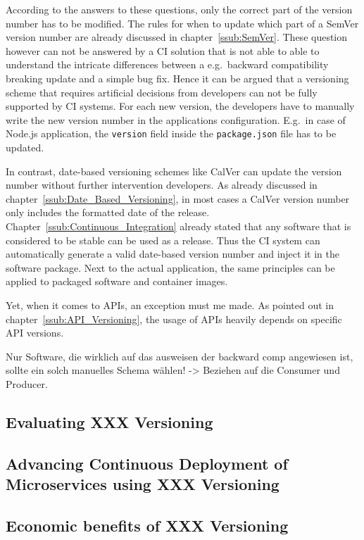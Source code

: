 According to the answers to these questions, only the correct part of the
version number has to be modified. The rules for when to update which part of a
SemVer version number are already discussed in chapter~\ref{ssub:SemVer}. These
question however can not be answered by a \ac{CI} solution that is not able to
able to understand the intricate differences between a e.g.\ backward
compatibility breaking update and a simple bug fix. Hence it can be argued that
a versioning scheme that requires artificial decisions from developers can not
be fully supported by \ac{CI} systems. For each new version, the developers
have to manually write the new version number in the applications
configuration. E.g.\ in case of Node.js application, the \texttt{version} field
inside the \texttt{package.json} file has to be updated.

In contrast, date-based versioning schemes like CalVer can update the version
number without further intervention developers. As already discussed in
chapter~\ref{ssub:Date_Based_Versioning}, in most cases a CalVer version number
only includes the formatted date of the release.
Chapter~\ref{ssub:Continuous_Integration} already stated that any software that
is considered to be stable can be used as a release. Thus the \ac{CI} system
can automatically generate a valid date-based version number and inject it in
the software package. Next to the actual application, the same principles can
be applied to packaged software and container images.

Yet, when it comes to \acp{API}, an exception must me made. As pointed out in
chapter~\ref{ssub:API_Versioning}, the usage of \acp{API} heavily depends on
specific \ac{API} versions.

Nur Software, die wirklich auf das ausweisen der backward comp angewiesen ist,
sollte ein solch manuelles Schema wählen! -> Beziehen auf die Consumer und
Producer.

\subsection{Evaluating XXX Versioning}%
\label{sub:Evaluating_XXX_Versioning}

\subsection{Advancing Continuous Deployment of Microservices using XXX Versioning}%
\label{sub:Advancing_Continuous_Deployment_of_Microservices_using_XXX_Versioning}

\subsection{Economic benefits of XXX Versioning}%
\label{sub:Economic_benefits_of_XXX_Versioning}

